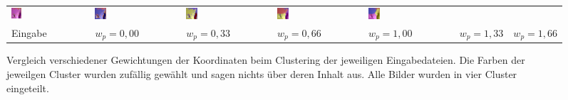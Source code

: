 \begin{figure}[h!]
\begin{tabular}{p{}p{}p{}p{}p{}p{}p{}}
		\includegraphics[width=0.14\textwidth]{images/gen/spatial_weight/p03_04.png_0.33.png} &
		\includegraphics[width=0.14\textwidth]{images/gen/spatial_weight/p03_04.png_0.66.png} &
		\includegraphics[width=0.14\textwidth]{images/gen/spatial_weight/p03_04.png_1.00.png} &
		\includegraphics[width=0.14\textwidth]{images/gen/spatial_weight/p03_04.png_1.33.png} &
		\includegraphics[width=0.14\textwidth]{images/gen/spatial_weight/p03_04.png_1.66.png} \\
		
		\hspace{2pt}\newline\centering Eingabe & 
		\hspace{2pt}\newline\centering $w_p=0,00$ &
		\hspace{2pt}\newline\centering $w_p=0,33$ &
		\hspace{2pt}\newline\centering $w_p=0,66$ &
		\hspace{2pt}\newline\centering $w_p=1,00$ &
		\hspace{2pt}\newline\centering $w_p=1,33$ &
		\hspace{2pt}\newline\centering $w_p=1,66$
	\end{tabular}
	\caption{Vergleich verschiedener Gewichtungen der Koordinaten beim Clustering der jeweiligen Eingabedateien. Die Farben der jeweilgen Cluster wurden zufällig gewählt und sagen nichts über deren Inhalt aus. Alle Bilder wurden in vier Cluster eingeteilt.}
	\label{fig:filterbank_weights_pos}
\end{figure}

